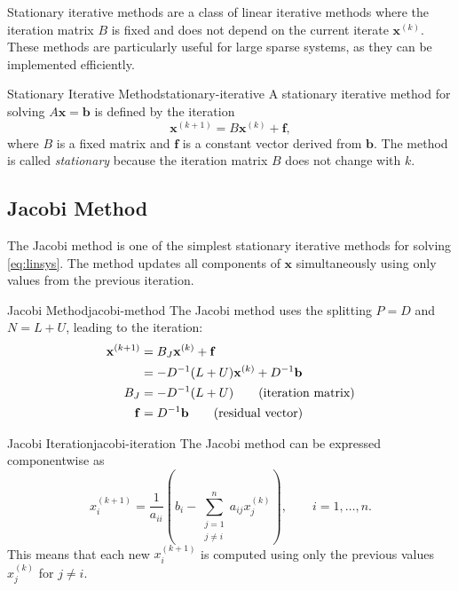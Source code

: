 Stationary iterative methods are a class of linear iterative methods where the iteration matrix \(B\) is fixed and does not depend on the current iterate \(\mathbf{x}^{(k)}\). These methods are particularly useful for large sparse systems, as they can be implemented efficiently.
\begin{definition}{Stationary Iterative Method}{stationary-iterative}
    A stationary iterative method for solving \(A\mathbf{x} = \mathbf{b}\) is defined by the iteration
    \begin{equation}
        \mathbf{x}^{(k+1)} = B\mathbf{x}^{(k)} + \mathbf{f},
        \label{eq:stationary-iterative}
    \end{equation}
    where \(B\) is a fixed matrix and \(\mathbf{f}\) is a constant vector derived from \(\mathbf{b}\).
    The method is called \emph{stationary} because the iteration matrix \(B\) does not change with \(k\).
\end{definition}


\subsection{Jacobi Method}
The Jacobi method is one of the simplest stationary iterative methods for solving \eqref{eq:linsys}.
The method updates all components of \(\mathbf{x}\) simultaneously using only values from the previous iteration.

\begin{definition}{Jacobi Method}{jacobi-method}
    The Jacobi method uses the splitting \(P = D\) and \(N = L + U\), leading to the iteration:
    \begin{align}
        \mathbf{x}^{(k+1)} &= B_J \mathbf{x}^{(k)} + \mathbf{f} \\
        &= -D^{-1}(L + U) \mathbf{x}^{(k)} + D^{-1}\mathbf{b} \notag \\
        B_J &= -D^{-1}(L + U) \tag{iteration matrix} \\
        \mathbf{f} &= D^{-1}\mathbf{b} \tag{residual vector}
    \end{align}
\end{definition}

\begin{corollary}{Jacobi Iteration}{jacobi-iteration}
    The Jacobi method can be expressed componentwise as
    \begin{equation}
        x_i^{(k+1)} = \frac{1}{a_{ii}}\left(b_i - \sum_{\substack{j=1 \\ j \neq i}}^n a_{ij} x_j^{(k)}\right), \qquad i = 1, \ldots, n.
    \end{equation}
    This means that each new \(x_i^{(k+1)}\) is computed using only the previous values \(x_j^{(k)}\) for \(j \neq i\).
\end{corollary}

